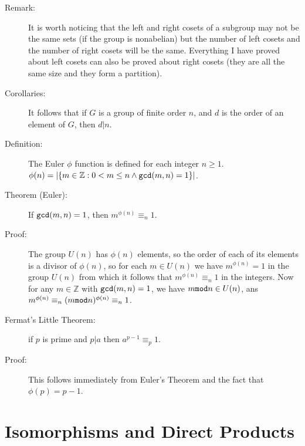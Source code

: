 \documentclass[12pt]{article}
\begin{document}
\begin{description}
\item[Remark:]  It is worth noticing that the left and right cosets of a subgroup may not be the same sets (if the group is nonabelian) but the number of left cosets and the number of right cosets will be the same.
Everything I have proved about left cosets can also be proved about right cosets (they are all the same size and they form a partition).

\item[Corollaries:]  It follows that if $G$ is a group of finite order $n$, and $d$ is the order of an element of $G$, then $d|n$.

\item[Definition:]  The Euler $\phi$ function is defined for each integer $n\geq 1$.  $\phi(n) = |\{m \in {\mathbb Z}:0 <m\leq n \wedge {\tt gcd}(m,n) = 1\}|$.

\item[Theorem (Euler):]  If ${\tt gcd}(m,n)=1$, then $m^{\phi(n)} \equiv_n 1$.

\item[Proof:]  The group $U(n)$ has $\phi(n)$ elements, so the order of each of its elements is a divisor of $\phi(n)$,
so for each $m \in U(n)$ we have $m^{\phi(n)}=1$ in the group $U(n)$ from which it follows that $m^{\phi(n)} \equiv_n 1$ in the integers.
Now for any $m \in {\mathbb Z}$ with ${\tt gcd}(m,n)=1$, we have $m {\tt mod} n \in U(n)$, ans $m^{\phi(n)} \equiv_n (m{\tt mod}n)^{\phi(n)} \equiv_n 1$.

\item[Fermat's Little Theorem:]  if $p$ is prime and $p|a$ then $a^{p-1}\equiv_p 1$.

\item[Proof:]  This follows immediately from Euler's Theorem and the fact that $\phi(p) = p-1$.

\end{description}


\section{Isomorphisms and Direct Products}
\end{document}
